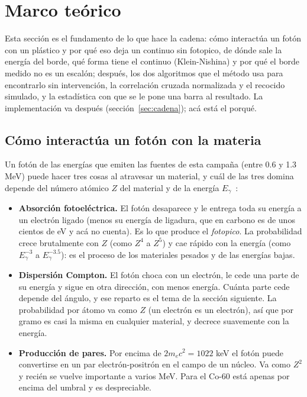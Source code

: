 \documentclass[11pt,a4paper]{article}
\begin{document}
\section{Marco teórico}
\label{sec:fisica}

Esta sección es el fundamento de lo que hace la cadena: cómo interactúa un
fotón con un plástico y por qué eso deja un continuo sin fotopico, de dónde
sale la energía del borde, qué forma tiene el continuo (Klein-Nishina) y por
qué el borde medido no es un escalón; después, los dos algoritmos que el
método usa para encontrarlo sin intervención, la correlación cruzada
normalizada y el recocido simulado, y la estadística con que se le pone una
barra al resultado. La implementación va después
(sección~\ref{sec:cadena}); acá está el porqué.

\subsection{Cómo interactúa un fotón con la materia}
\label{sec:interaccion}

Un fotón de las energías que emiten las fuentes de esta campaña (entre 0.6 y
1.3 MeV) puede hacer tres cosas al atravesar un material, y cuál de las tres
domina depende del número atómico $Z$ del material y de la energía
$E_\gamma$~\cite{knoll2010}:

\begin{itemize}
\item \textbf{Absorción fotoeléctrica.} El fotón desaparece y le entrega toda
      su energía a un electrón ligado (menos su energía de ligadura, que en
      carbono es de unos cientos de eV y acá no cuenta). Es lo que produce el
      \emph{fotopico}. La probabilidad crece brutalmente con $Z$ (como
      $Z^4$ a $Z^5$) y cae rápido con la energía (como $E_\gamma^{-3}$ a
      $E_\gamma^{-3.5}$): es el proceso de los materiales pesados y de las
      energías bajas.
\item \textbf{Dispersión Compton.} El fotón choca con un electrón, le cede
      una parte de su energía y sigue en otra dirección, con menos energía.
      Cuánta parte cede depende del ángulo, y ese reparto es el tema de la
      sección siguiente. La probabilidad por átomo va como $Z$ (un electrón
      es un electrón), así que por gramo es casi la misma en cualquier
      material, y decrece suavemente con la energía.
\item \textbf{Producción de pares.} Por encima de $2 m_e c^2 = 1022$ keV el
      fotón puede convertirse en un par electrón-positrón en el campo de un
      núcleo. Va como $Z^2$ y recién se vuelve importante a varios MeV. Para
      el Co-60 está apenas por encima del umbral y es despreciable.
\end{itemize}
\end{document}
